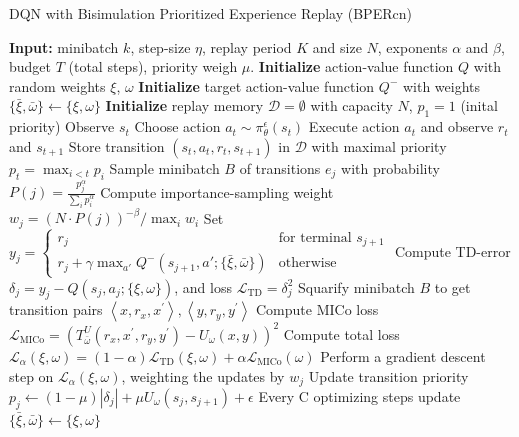 \begin{algorithm}
\caption{DQN with Bisimulation Prioritized Experience Replay (BPERcn)}
\label{algorithm:dqn_bper}
\begin{algorithmic}[1]
\State \textbf{Input:} minibatch $k$, step-size $\eta$, replay period $K$ and size $N$, exponents $\alpha$ and $\beta$, budget $T$ (total steps), priority weigh $\mu$.
\State \textbf{Initialize} action-value function $Q$ with random weights $\xi$, $\omega$
\State \textbf{Initialize} target action-value function $Q^-$ with weights $\{\bar{\xi},\bar{\omega}\} \leftarrow \{\xi, \omega\}$
\State \textbf{Initialize} replay memory $\mathcal{D} = \emptyset$ with capacity $N$, $p_1 = 1$ (inital priority) %
    \State Observe $s_t$
    \State Choose action $a_t \sim \pi^\epsilon_\theta(s_t)$
    \State Execute action $a_t$ and observe $r_t$ and $s_{t+1}$
    \State Store transition $(s_t, a_t, r_t, s_{t+1})$ in $\mathcal{D}$ with maximal priority $p_t = \max_{i < t} p_i$
        \State Sample minibatch $B$ of transitions $e_j$ with probability $P(j) = \frac{p_j^\alpha}{\sum_i p_i^\alpha}$    
        \State Compute importance-sampling weight $w_j = \left( N \cdot P(j) \right)^{-\beta} / \max_i w_i$
        \State Set $y_j = 
        \begin{cases} 
            r_j & \text{for terminal } s_{j+1}\\
            r_j + \gamma \max_{a'} Q^-(s_{j+1}, a'; \{\bar{\xi},\bar{\omega}\}) & \text{otherwise}
        \end{cases}$
        \State Compute TD-error $\delta_j = y_j - Q(s_{j}, a_{j}; \{\xi, \omega\})$, and loss $\mathcal{L}_{\text{TD}} = \delta_j^2 $
        \State Squarify minibatch $B$ to get transition pairs $\left\langle x, r_x, x^{\prime}\right\rangle,\left\langle y, r_y, y^{\prime}\right\rangle$ 
        \State Compute MICo loss $\mathcal{L}_{\text{MICo}} = \left(T_{\bar{\omega}}^U\left(r_x, x^{\prime}, r_y, y^{\prime}\right)-U_\omega(x, y)\right)^2$
        \State Compute total loss $\mathcal{L}_\alpha(\xi, \omega) = (1 - \alpha) \mathcal{L}_{\text{TD}}(\xi, \omega) + \alpha \mathcal{L}_{\text{MICo}}(\omega)$
        \State Perform a gradient descent step on $\mathcal{L}_\alpha(\xi, \omega)$, weighting the updates by $w_j$
        \State Update transition priority $p_j \leftarrow (1 - \mu) |\delta_j| + \mu U_\omega(s_j,s_{j+1}) + \epsilon$
        \State Every C optimizing steps update $\{\bar{\xi},\bar{\omega}\} \leftarrow \{\xi, \omega\}$
        


\end{algorithmic}
\end{algorithm}
